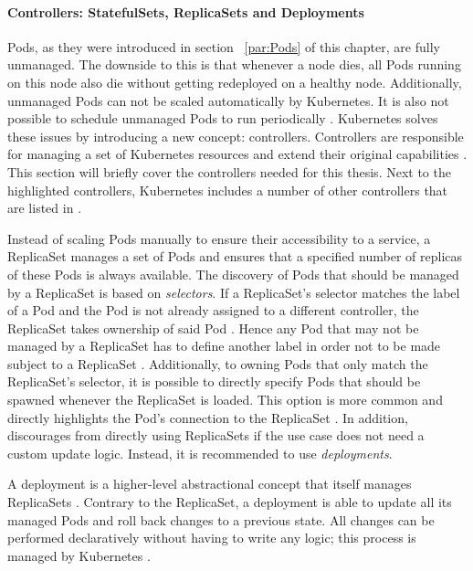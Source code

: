 \paragraph{Controllers: StatefulSets, ReplicaSets and Deployments}%
\label{par:Controllers}
Pods, as they were introduced in section ~\ref{par:Pods} of this chapter,
are fully unmanaged. The downside to this is that whenever a node dies, all
Pods running on this node also die without getting redeployed on a healthy
node. Additionally, unmanaged Pods can not be scaled automatically by
Kubernetes. It is also not possible to schedule unmanaged Pods to run
periodically \autocite[Ch. 4]{LuksaKubernetesAction2017}. Kubernetes solves
these issues by introducing a new concept: controllers. Controllers are
responsible for managing a set of Kubernetes resources and extend their
original capabilities \autocite{AuthorsConcepts2019}. This section will briefly
cover the controllers needed for this thesis. Next to the highlighted
controllers, Kubernetes includes a number of other controllers that are listed
in \autocite{AuthorsConcepts2019}.

Instead of scaling Pods manually to ensure their accessibility to a service, a
ReplicaSet manages a set of Pods and ensures that a specified number of
replicas of these Pods is always available. The discovery of Pods that should
be managed by a ReplicaSet is based on \textit{selectors}. If a ReplicaSet's
selector matches the label of a Pod and the Pod is not already assigned to a
different controller, the ReplicaSet takes ownership of said Pod \autocite[Ch.
4]{LuksaKubernetesAction2017}. Hence any Pod that may not be managed by a
ReplicaSet has to define another label in order not to be made subject to a
ReplicaSet \autocite{AuthorsReplicaSet2019}. Additionally, to owning Pods that
only match the ReplicaSet's selector, it is possible to directly specify Pods
that should be spawned whenever the ReplicaSet is loaded. This option is more
common and directly highlights the Pod's connection to the ReplicaSet
\autocite{AuthorsReplicaSet2019}. In addition, \autocite{AuthorsReplicaSet2019}
discourages from directly using ReplicaSets if the use case does not need a
custom update logic. Instead, it is recommended to use \textit{deployments}.

A deployment is a higher-level abstractional concept that itself manages
ReplicaSets \autocite{AuthorsReplicaSet2019}. Contrary to the ReplicaSet, a
deployment is able to update all its managed Pods and roll back changes to a
previous state. All changes can be performed declaratively without having to
write any logic; this process is managed by Kubernetes \autocite[Ch.
9]{LuksaKubernetesAction2017}.

